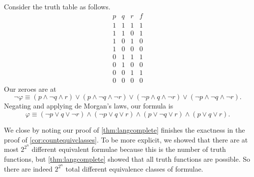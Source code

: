 \begin{example}
	Consider the truth table as follows.
	\[\begin{array}{c|c|c||c}
		p & q & r & f \\
		\hline
		1 & 1 & 1 & 1 \\
		1 & 1 & 0 & 1 \\
		1 & 0 & 1 & 0 \\
		1 & 0 & 0 & 0 \\
		0 & 1 & 1 & 1 \\
		0 & 1 & 0 & 0 \\
		0 & 0 & 1 & 1 \\
		0 & 0 & 0 & 0
	\end{array}\]
	Our zeroes are at
	\[\lnot\varphi\equiv(p\land\lnot q\land r)\lor(p\land\lnot q\land\lnot r)\lor(\lnot p\land q\land\lnot r)\lor(\lnot p\land\lnot q\land\lnot r).\]
	Negating and applying de Morgan's laws, our formula is
	\[\varphi\equiv(\lnot p\lor q\lor\lnot r)\land(\lnot p\lor q\lor r)\land( p\lor\lnot q\lor r)\land( p\lor q\lor r).\]
\end{example}

We close by noting our proof of \autoref{thm:langcomplete} finishes the exactness in the proof of \autoref{cor:countequivclasses}. To be more explicit, we showed that there are at most $2^{2^n}$ different equivalent formulae because this is the number of truth functions, but \autoref{thm:langcomplete} showed that all truth functions are possible. So there are indeed $2^{2^n}$ total different equivalence classes of formulae.

